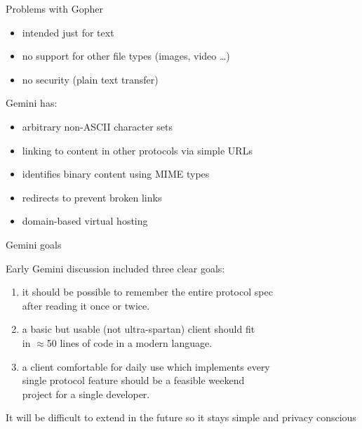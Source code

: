 \documentclass[presentation, 11pt,  aspectratio=169]{beamer}
\begin{document}
\begin{frame}[label={sec:orge5db9b4}]{Problems with Gopher}
\begin{itemize}
\item intended just for text\\
\item no support for other file types (images, video \ldots{})\\
\item no security (plain text transfer)\\
\end{itemize}
\pause
\begin{block}{Gemini has:}
\begin{itemize}
\item arbitrary non-ASCII character sets\\
\item linking to content in other protocols via simple URLs\\
\item identifies binary content using MIME types\\
\item redirects to prevent broken links\\
\item domain-based virtual hosting\\
\end{itemize}
\end{block}
\end{frame}

\begin{frame}[label={sec:org2aaf323}]{Gemini goals}
\begin{block}{Early Gemini discussion included three clear goals:}
\begin{enumerate}
\item it should be possible to remember the entire protocol spec\\
after reading it once or twice.\\

\item a basic but usable (not ultra-spartan) client should fit \\
in \(\approx\)50 lines of code in a modern language.\\

\item a client comfortable for daily use which implements every \\
single protocol feature should be a feasible weekend\\
project for a single developer.\\
\end{enumerate}
\pause
\end{block}
\begin{block}{It will be difficult to extend in the future}
so it \alert{stays} simple and privacy conscious\\
\end{block}
\end{frame}
\end{document}
